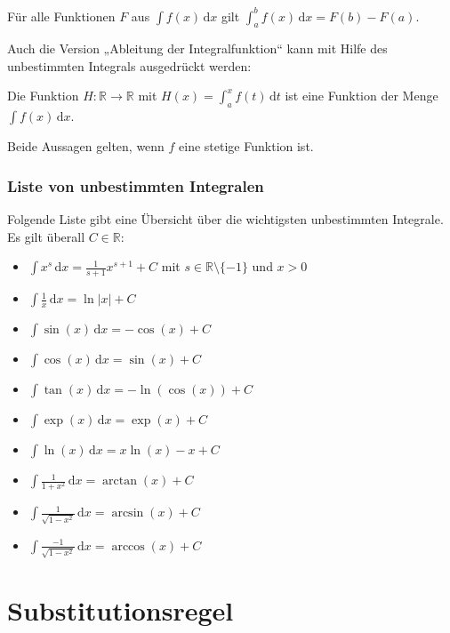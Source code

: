 \documentclass[fontsize=9pt,
               parskip=half-,
               DIV=14,
               listof=chapterentry,
               tocflat]{scrbook}
\begin{document}
\begin{importantparagraph*}
Für alle Funktionen $F$ aus $\int f(x)\,\mathrm {d} x$ gilt $\int _{a}^{b}f(x)\,\mathrm {d} x=F(b)-F(a)$.

\end{importantparagraph*}

Auch die Version „Ableitung der Integralfunktion“ kann mit Hilfe des unbestimmten Integrals ausgedrückt werden:

\begin{importantparagraph*}
Die Funktion $H:\mathbb {R} \to \mathbb {R} $ mit $H(x)=\int _{a}^{x}f(t)\,\mathrm {d} t$ ist eine Funktion der Menge $\int f(x)\,\mathrm {d} x$.

\end{importantparagraph*}

Beide Aussagen gelten, wenn $f$ eine stetige Funktion ist.

\subsection{Liste von unbestimmten Integralen}

Folgende Liste gibt eine Übersicht über die wichtigsten unbestimmten Integrale. Es gilt überall $C\in \mathbb {R} $:

\begin{itemize}
\item $\int x^{s}\,\mathrm {d} x={\frac {1}{s+1}}x^{s+1}+C$ mit $s\in \mathbb {R} \setminus \{-1\}$ und $x>0$
\item $\int {\frac {1}{x}}\,\mathrm {d} x=\ln |x|+C$
\item $\int \sin(x)\,\mathrm {d} x=-\cos(x)+C$
\item $\int \cos(x)\,\mathrm {d} x=\sin(x)+C$
\item $\int \tan(x)\,\mathrm {d} x=-\ln(\cos(x))+C$
\item $\int \exp(x)\,\mathrm {d} x=\exp(x)+C$
\item $\int \ln(x)\,\mathrm {d} x=x\ln(x)-x+C$
\item $\int {\frac {1}{1+x^{2}}}\,\mathrm {d} x=\arctan(x)+C$
\item $\int {\frac {1}{\sqrt {1-x^{2}}}}\,\mathrm {d} x=\arcsin(x)+C$
\item $\int {\frac {-1}{\sqrt {1-x^{2}}}}\,\mathrm {d} x=\arccos(x)+C$
\end{itemize}

\chapter{Substitutionsregel}
\end{document}
